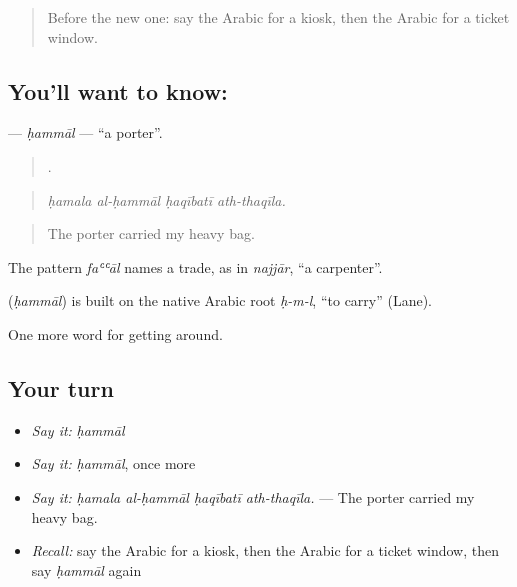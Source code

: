 \label{lesson:AR-C436-hammal}



\begin{quote}
Before the new one: say the Arabic for a kiosk, then the Arabic for a ticket window.
\end{quote}

\subsection*{You'll want to know: }
\textbf{} — \emph{ḥammāl} — \textquotedblleft{}a porter\textquotedblright{}.

\begin{quote}
   .
\end{quote}

\begin{quote}
\emph{ḥamala al-ḥammāl ḥaqībatī ath-thaqīla.}
\end{quote}

\begin{quote}
The porter carried my heavy bag.
\end{quote}

The pattern \emph{faʿʿāl} names a trade, as in \emph{najjār}, \textquotedblleft{}a carpenter\textquotedblright{}.

\begin{cousinweb}
\textbf{} (\emph{ḥammāl}) is built on the native Arabic root \emph{ḥ-m-l}, \textquotedblleft{}to carry\textquotedblright{} (Lane).
\end{cousinweb}

\begin{grammarlens}[title={What you've built}]
One more word for getting around.
\end{grammarlens}

\subsection*{Your turn}
\begin{itemize}
\raggedright
  \item \emph{Say it:} \emph{ḥammāl}
  \item \emph{Say it:} \emph{ḥammāl}, once more
  \item \emph{Say it:} \emph{ḥamala al-ḥammāl ḥaqībatī ath-thaqīla.} — The porter carried my heavy bag.
  \item \emph{Recall:} say the Arabic for a kiosk, then the Arabic for a ticket window, then say \emph{ḥammāl} again
\end{itemize}

